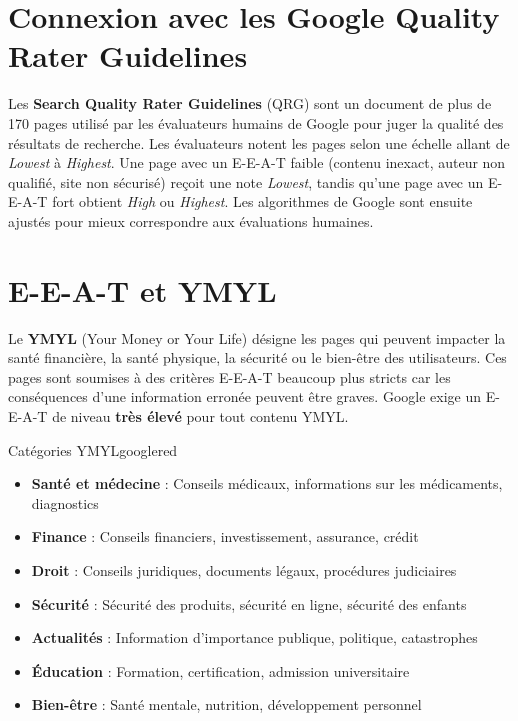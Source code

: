 \documentclass[12pt,a4paper,twoside]{report}
\newcommand{\keyword}[1]{\textbf{\textcolor{googleblue}{#1}}}
\begin{document}
\section{Connexion avec les Google Quality Rater Guidelines}

Les \keyword{Search Quality Rater Guidelines} (QRG) sont un document de plus de 170 pages utilisé par les évaluateurs humains de Google pour juger la qualité des résultats de recherche. Les évaluateurs notent les pages selon une échelle allant de \textit{Lowest} à \textit{Highest}. Une page avec un E-E-A-T faible (contenu inexact, auteur non qualifié, site non sécurisé) reçoit une note \textit{Lowest}, tandis qu'une page avec un E-E-A-T fort obtient \textit{High} ou \textit{Highest}. Les algorithmes de Google sont ensuite ajustés pour mieux correspondre aux évaluations humaines.

\section{E-E-A-T et YMYL}

Le \keyword{YMYL} (Your Money or Your Life) désigne les pages qui peuvent impacter la santé financière, la santé physique, la sécurité ou le bien-être des utilisateurs. Ces pages sont soumises à des critères E-E-A-T beaucoup plus stricts car les conséquences d'une information erronée peuvent être graves. Google exige un E-E-A-T de niveau \textbf{très élevé} pour tout contenu YMYL.

\begin{mybox}{Catégories YMYL}{googlered}
\begin{itemize}
    \item \textbf{Santé et médecine} : Conseils médicaux, informations sur les médicaments, diagnostics
    \item \textbf{Finance} : Conseils financiers, investissement, assurance, crédit
    \item \textbf{Droit} : Conseils juridiques, documents légaux, procédures judiciaires
    \item \textbf{Sécurité} : Sécurité des produits, sécurité en ligne, sécurité des enfants
    \item \textbf{Actualités} : Information d'importance publique, politique, catastrophes
    \item \textbf{Éducation} : Formation, certification, admission universitaire
    \item \textbf{Bien-être} : Santé mentale, nutrition, développement personnel
\end{itemize}
\end{mybox}
\end{document}
